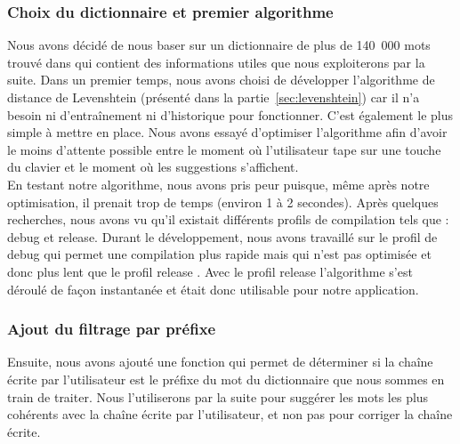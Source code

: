 \documentclass[a4paper, 11pt]{report}
\begin{document}
{\subsubsection{Choix du dictionnaire et premier algorithme}
Nous avons décidé de nous baser sur un dictionnaire de plus de 140~000 mots trouvé dans \cite{new2019lexique} qui contient des informations utiles que nous exploiterons par la suite. Dans un premier temps, nous avons choisi de développer l'algorithme de distance de Levenshtein (présenté dans la partie~\ref{sec:levenshtein}) car il n'a besoin ni d'entraînement ni d'historique pour fonctionner. C'est également le plus simple à mettre en place. Nous avons essayé d'optimiser l'algorithme afin d'avoir le moins d'attente possible entre le moment où l'utilisateur tape sur une touche du clavier et le moment où les suggestions s'affichent. \\

En testant notre algorithme, nous avons pris peur puisque, même après notre optimisation, il prenait trop de temps (environ 1 à 2 secondes). Après quelques recherches, nous avons vu qu'il existait  différents profils de compilation tels que : \og{}debug \fg{} et \og{}release\fg{}. Durant le développement, nous avons travaillé sur le profil de \og{}debug \fg{} qui permet une compilation plus rapide mais qui n'est pas optimisée et donc plus lent que le profil \og{}release \fg{}. Avec le profil \og{}release \fg{} l'algorithme s'est déroulé de façon instantanée et était donc utilisable pour notre application.\\

\subsubsection{Ajout du filtrage par préfixe}
Ensuite, nous avons ajouté une fonction qui permet de déterminer si la chaîne écrite par l'utilisateur est le préfixe du mot du dictionnaire que nous sommes en train de traiter. Nous l'utiliserons par la suite pour suggérer les mots les plus cohérents avec la chaîne écrite par l'utilisateur, et non pas pour corriger la chaîne écrite.\\

\newpage
}
\end{document}

